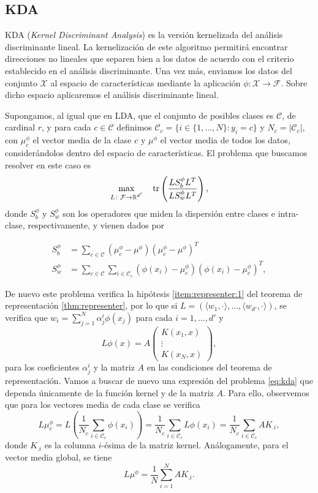 \documentclass{book}
\begin{document}
\subsection{KDA}

KDA (\emph{Kernel Discriminant Analysis}) \cite{kda} es la versión kernelizada del análisis discriminante lineal. La kernelización de este algoritmo permitirá encontrar direcciones no lineales que separen bien a los datos de acuerdo con el criterio establecido en el análisis discriminante. Una vez más, enviamos los datos del conjunto $\mathcal{X}$ al espacio de características mediante la aplicación $\phi \colon \mathcal{X} \to \mathcal{F}$. Sobre dicho espacio aplicaremos el análisis discriminante lineal.

Supongamos, al igual que en LDA, que el conjunto de posibles clases es $\mathcal{C}$, de cardinal $r$, y para cada $c \in \mathcal{C}$ definimos $\mathcal{C}_c = \{i \in \{1,\dots,N\} \colon y_i = c\}$ y $N_c = |\mathcal{C}_c|$, con $\mu_c^{\phi}$ el vector media de la clase $c$ y $\mu^{\phi}$ el vector media de todos los datos, considerándolos dentro del espacio de características. El problema que buscamos resolver en este caso es
\begin{equation} \label{eq:kda}
	\max_{\substack{L \colon \mathcal{F} \to \mathbb{R}^{d'} }} \quad \operatorname{tr}\left(\frac{L S_b^{\phi} L^T}{LS_w^{\phi}L^T}\right),
\end{equation}
donde $S_b^{\phi}$ y $S_w^{\phi}$ son los operadores que miden la dispersión entre clases e intra-clase, respectivamente, y vienen dados por

\begin{align*}
	S_b^{\phi} &= \sum_{c \in \mathcal{C}}(\mu_c^{\phi} - \mu^{\phi})(\mu_c^{\phi} - \mu^{\phi})^T \\
	S_w^{\phi} &= \sum_{c \in \mathcal{C}}\sum_{i \in \mathcal{C}_c}(\phi(x_i)-\mu_c^{\phi})(\phi(x_i)-\mu_c^{\phi})^T,
\end{align*}

De nuevo este problema verifica la hipótesis \ref{item:representer:1} del teorema de representación \ref{thm:representer}, por lo que si $L = (\langle w_1,\cdot\rangle, \dots, \langle w_{d'}, \cdot \rangle)$, se verifica que $w_i = \sum_{j=1}^N \alpha_j^i \phi(x_j)$ para cada $i = 1,\dots,d'$ y
\[L\phi(x) = A \begin{pmatrix} K(x_1,x) \\ \vdots \\ K(x_N,x) \end{pmatrix}, \]
para los coeficientes $\alpha_j^i$ y la matriz $A$ en las condiciones del teorema de representación. Vamos a buscar de nuevo una expresión del problema \ref{eq:kda} que dependa únicamente de la función kernel y de la matriz $A$. Para ello, observemos que para los vectores media de cada clase se verifica
\[ L\mu_c^{\phi} = L\left(\frac{1}{N_c} \sum_{i \in \mathcal{C}_c} \phi(x_i)\right) = \frac{1}{N_c}\sum_{i \in \mathcal{C}_c}L\phi(x_i) = \frac{1}{N_c}\sum_{i \in \mathcal{C}_c}AK_{.i},  \]
donde $K_{.i}$ es la columna $i$-ésima de la matriz kernel. Análogamente, para el vector media global, se tiene
\[ L\mu^{\phi} = \frac{1}{N} \sum_{i=1}^NAK_{.i}. \]
\end{document}
